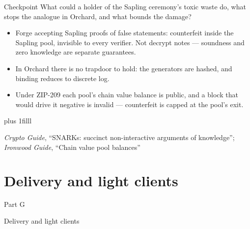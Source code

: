 \documentclass[aspectratio=169,11pt]{beamer}
\newcommand{\ivk}{\ensuremath{\mathsf{ivk}}}
\newcommand{\rcm}{\ensuremath{\mathsf{rcm}}}
\newcommand{\divider}[2]{%
  \section{#2}
  \begin{frame}[plain,t]
  \vspace*{14mm}
  {\small\color{arb}#1\par}
  \vskip8mm
  \begin{minipage}{0.88\textwidth}\raggedright
    \fontsize{27}{31}\selectfont #2\par
  \end{minipage}
  \end{frame}}
\newcommand{\src}[1]{\par\vskip0pt plus 1filll
  {\fontsize{6}{7.2}\selectfont\color{arbdim}\raggedright #1\par}}
\begin{document}
\begin{frame}{Checkpoint}
\Large
What could a holder of the Sapling ceremony's toxic waste do, what
stops the analogue in Orchard, and what bounds the damage?
\pause
\normalsize
\medskip
\begin{itemize}
  \item Forge accepting Sapling proofs of false statements:
    counterfeit inside the Sapling pool, invisible to every verifier.
    Not decrypt notes --- soundness and zero knowledge are separate
    guarantees.
  \item In Orchard there is no trapdoor to hold: the generators are
    hashed, and binding reduces to discrete log.
  \item Under ZIP-209 each pool's chain value balance is public, and a
    block that would drive it negative is invalid --- counterfeit is
    capped at the pool's exit.
\end{itemize}
\src{\emph{Crypto Guide}, ``SNARKs: succinct non-interactive arguments of
knowledge''; \emph{Ironwood Guide}, ``Chain value pool balances''}
\end{frame}


\newcommand{\Fenc}{\ensuremath{C_{\mathrm{enc}}}}
\newcommand{\Fout}{\ensuremath{C_{\mathrm{out}}}}
\newcommand{\Fnp}{\ensuremath{\mathsf{np}}}
\newcommand{\Frseed}{\ensuremath{\mathsf{rseed}}}
\newcommand{\Fock}{\ensuremath{\mathsf{ock}}}
\newcommand{\Fpre}{\ensuremath{\mathsf{pre}_{\rcm}}}
\newcommand{\Fivkint}{\ensuremath{\ivk^{\mathsf{int}}}}
\newcommand{\Fkenc}{\ensuremath{K_{\mathrm{enc}}}}

\divider{Part G}{Delivery and light clients}
\end{document}
